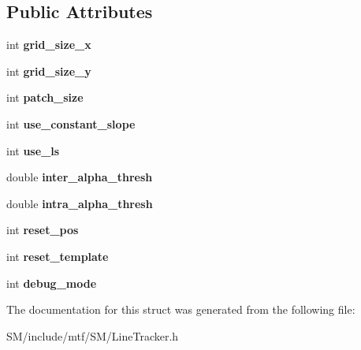 \subsection*{Public Attributes}
\begin{DoxyCompactItemize}
\item 
\hypertarget{structLineTrackerParams_adae60bfd2e932e5fd633b31c1b87b931}{int {\bfseries grid\-\_\-size\-\_\-x}}\label{structLineTrackerParams_adae60bfd2e932e5fd633b31c1b87b931}

\item 
\hypertarget{structLineTrackerParams_af4ec83608d4b87ce9f0659bd8cb9bbc9}{int {\bfseries grid\-\_\-size\-\_\-y}}\label{structLineTrackerParams_af4ec83608d4b87ce9f0659bd8cb9bbc9}

\item 
\hypertarget{structLineTrackerParams_a6f01f5eb0d2ee13df008a806bd59ff4f}{int {\bfseries patch\-\_\-size}}\label{structLineTrackerParams_a6f01f5eb0d2ee13df008a806bd59ff4f}

\item 
\hypertarget{structLineTrackerParams_ad103af792f1049023fd854b108e4a63a}{int {\bfseries use\-\_\-constant\-\_\-slope}}\label{structLineTrackerParams_ad103af792f1049023fd854b108e4a63a}

\item 
\hypertarget{structLineTrackerParams_a93d10a0cf2675a5c1708ccfed0102de8}{int {\bfseries use\-\_\-ls}}\label{structLineTrackerParams_a93d10a0cf2675a5c1708ccfed0102de8}

\item 
\hypertarget{structLineTrackerParams_a9932711c0c2f826b0231967a0ee4724c}{double {\bfseries inter\-\_\-alpha\-\_\-thresh}}\label{structLineTrackerParams_a9932711c0c2f826b0231967a0ee4724c}

\item 
\hypertarget{structLineTrackerParams_afa42fb3a59702dc8ceae3e938426953e}{double {\bfseries intra\-\_\-alpha\-\_\-thresh}}\label{structLineTrackerParams_afa42fb3a59702dc8ceae3e938426953e}

\item 
\hypertarget{structLineTrackerParams_abab14a042f02d7494276ff5b0687a9af}{int {\bfseries reset\-\_\-pos}}\label{structLineTrackerParams_abab14a042f02d7494276ff5b0687a9af}

\item 
\hypertarget{structLineTrackerParams_a13a8af4864adc58ad81e383475288970}{int {\bfseries reset\-\_\-template}}\label{structLineTrackerParams_a13a8af4864adc58ad81e383475288970}

\item 
\hypertarget{structLineTrackerParams_a6fc0885e58e1f32582a2cb9e0752969e}{int {\bfseries debug\-\_\-mode}}\label{structLineTrackerParams_a6fc0885e58e1f32582a2cb9e0752969e}

\end{DoxyCompactItemize}


The documentation for this struct was generated from the following file\-:\begin{DoxyCompactItemize}
\item 
S\-M/include/mtf/\-S\-M/Line\-Tracker.\-h\end{DoxyCompactItemize}
